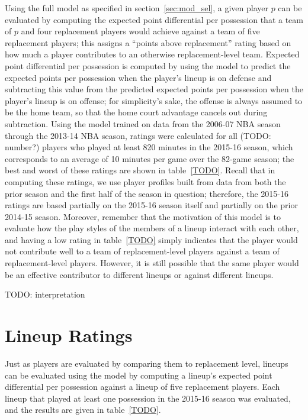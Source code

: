 Using the full model as specified in section~\ref{sec:mod_sel}, a given player $p$
can be evaluated by computing the expected point differential per possession that a
team of $p$ and four replacement players would achieve against a team of five
replacement players; this assigns a ``points above replacement'' rating based on how
much a player contributes to an otherwise replacement-level team. Expected point
differential per possession is computed by using the model to predict the expected
points per possession when the player's lineup is on defense and subtracting this
value from the predicted expected points per possession when the player's lineup is
on offense; for simplicity's sake, the offense is always assumed to be the home
team, so that the home court advantage cancels out during subtraction. Using the
model trained on data from the 2006-07 NBA season through the 2013-14 NBA season,
ratings were calculated for all (TODO: number?) players who played at least 820
minutes in the 2015-16 season, which corresponds to an average of 10 minutes per
game over the 82-game season; the best and worst of these ratings are shown in
table~\ref{TODO}. Recall that in computing these ratings, we use player profiles
built from data from both the prior season and the first half of the season in
question; therefore, the 2015-16 ratings are based partially on the 2015-16 season
itself and partially on the prior 2014-15 season. Moreover, remember that the
motivation of this model is to evaluate how the play styles of the members of a
lineup interact with each other, and having a low rating in table~\ref{TODO} simply
indicates that the player would not contribute well to a team of replacement-level
players against a team of replacement-level players. However, it is still possible
that the same player would be an effective contributor to different lineups or
against different lineups.

TODO: interpretation

\section{Lineup Ratings}

Just as players are evaluated by comparing them to replacement level, lineups can be
evaluated using the model by computing a lineup's expected point differential per
possession against a lineup of five replacement players. Each lineup that played at
least one possession in the 2015-16 season was evaluated, and the results are given
in table~\ref{TODO}.

